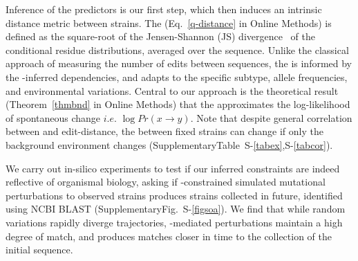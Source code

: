 \documentclass[onecolumn, compsoc,10pt]{IEEEtran}
\def\SUPPLEMENTARY{Supplementary}
\def\METHODS{Online Methods\xspace}
\begin{document}
Inference of the \enet predictors is our first step, which then induces  an intrinsic distance metric between strains. The \qdist  (Eq.~\eqref{q-distance} in \METHODS) is defined as the square-root of the Jensen-Shannon (JS) divergence~\cite{cover} of the conditional residue distributions, averaged over the sequence. Unlike the classical approach of measuring the number of edits between sequences, the \qdist is informed by the \enet-inferred  dependencies, and adapts to the specific subtype, allele frequencies, and environmental variations. Central to our approach is the theoretical result (Theorem~\ref{thmbnd} in \METHODS) that the \qdist  approximates the log-likelihood of spontaneous change $i.e.$ $\log Pr(x \rightarrow y )$. Note that despite general correlation between \qdist and edit-distance, the \qdist between fixed strains can change if only the background environment changes (\SUPPLEMENTARY Table~S-\ref{tabex},S-\ref{tabcor}).


We carry out in-silico experiments to test if our inferred  constraints  are indeed reflective of organismal  biology, asking if \enet-constrained simulated mutational perturbations to observed strains produces strains  collected in future, identified using NCBI BLAST (\SUPPLEMENTARY Fig.~S-\ref{figsoa}). We find that while random variations rapidly diverge  trajectories, \enet-mediated perturbations maintain a high degree of match, and produces matches closer in time to the collection of the  initial sequence.
\end{document}
